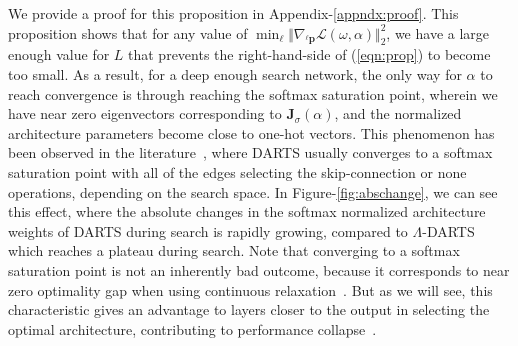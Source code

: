 \documentclass{article} \usepackage{fancyhdr, iclr2023_conference, times}
\def\vp{{\bm{p}}}
\def\mJ{{\bm{J}}}
\newcommand{\mydarts}{$\Lambda$-DARTS\xspace}
\begin{document}
We provide a proof for this proposition in Appendix-\ref{appndx:proof}. This proposition shows that for any value of $\min_\ell \Vert \nabla_{{}^\ell \vp}\mathcal{L}(\omega, \alpha)\Vert_2^2$, we have a large enough value for $L$ that prevents the right-hand-side of (\ref{eqn:prop}) to become too small. As a result, for a deep enough search network, the only way for $\alpha$ to reach convergence is through reaching the softmax saturation point, wherein we have near zero eigenvectors corresponding to $\mJ_\sigma(\alpha)$, and the normalized architecture parameters become close to one-hot vectors. This phenomenon has been observed in the literature~\citep{DBLP:journals/corr/abs-1910-11831, DBLP:conf/iclr/Dong020}, where DARTS usually converges to a softmax saturation point with all of the edges selecting the skip-connection or none operations, depending on the search space. In Figure-\ref{fig:abschange}, we can see this effect, where the absolute changes in the softmax normalized architecture weights of DARTS during search is rapidly growing, compared to \mydarts which reaches a plateau during search. Note that converging to a softmax saturation point is not an inherently bad outcome, because it corresponds to near zero optimality gap when using continuous relaxation~\citep{DBLP:books/cu/BV2014}. But as we will see, this characteristic gives an advantage to layers closer to the output in selecting the optimal architecture, contributing to performance collapse~\citep{DBLP:conf/iclr/ZelaESMBH20}.
\end{document}
